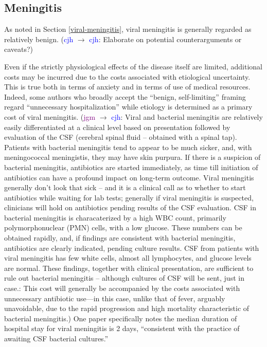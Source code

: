 \documentclass[12pt]{article}
\newcommand{\cjh}{\textcolor{blue}{cjh}}
\newcommand{\jgm}{\textcolor{purple}{jgm}}
\newcommand{\msg}[3]{(#1 $\rightarrow$ #2: #3)}
\newcommand{\mcc}[1]{\msg\cjh\cjh{#1}}
\newcommand{\mgc}[1]{\msg\jgm\cjh{#1}}
\begin{document}
        \subsection{Meningitis}
            \label{cost-meningitis}
            As noted in Section \ref{viral-meningitis}, viral meningitis is generally regarded as relatively benign. \mcc{Elaborate on potential counterarguments or caveats?}

            Even if the strictly physiological effects of the disease itself are limited, additional costs may be incurred due to the costs associated with etiological uncertainty. This is true both in terms of anxiety and in terms of use of medical resources. Indeed, some authors who broadly accept the ``benign, self-limiting'' framing regard ``unnecessary hospitalization'' while etiology is determined as a primary cost of viral meningitis\cite{balada2019cost}. \mgc{Viral and bacterial meningitis are relatively easily differentiated at a clinical level based on presentation followed by evaluation of the CSF (cerebral spinal fluid – obtained with a spinal tap).  Patients with bacterial meningitis tend to appear to be much sicker, and, with meningococcal meningistis, they may have skin purpura.  If there is a suspicion of bacterial meningitis, antibiotics are started immediately, as time till initiation of antibiotics can have a profound impact on long-term outcome.  Viral meningitis generally don’t look that sick – and it is a clinical call as to whether to start antibiotics while waiting for lab tests; generally if viral meningitis is suspected, clinicians will hold on antibiotics pending results of the CSF evaluation.  CSF in bacterial meningitis is characaterized by a high WBC count, primarily polymorphonuclear (PMN) cells, with a low glucose.  These numbers can be obtained rapidly, and, if findings are consistent with bacterial meningitis, antibiotics are clearly indicated, pending culture results.  CSF from patients with viral meningitis has few white cells, almost all lymphocytes, and glucose levels are normal.  These findings, together with clinical presentation, are sufficient to rule out bacterial meningitis – although cultures of CSF will be sent, just in case.: This cost will generally be accompanied by the costs associated with unnecessary antibiotic use---in this case, unlike that of fever, arguably unavoidable, due to the rapid progression and high mortality characteristic of bacterial meningitis.} One paper\cite{hasbun2019epidemiology} specifically notes the median duration of hospital stay for viral meningitis is 2 days, ``consistent with the practice of awaiting CSF bacterial cultures.''
\end{document}
